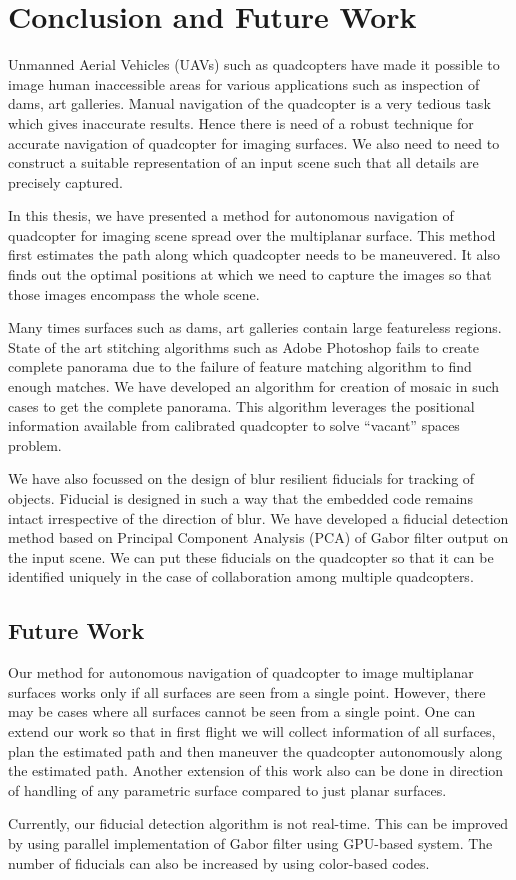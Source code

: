 \chapter{Conclusion and Future Work}
\label{sec:conclusion}
Unmanned Aerial Vehicles (UAVs) such as quadcopters have made it possible to
image human inaccessible areas for various applications such as inspection of
dams, art galleries. Manual navigation of the quadcopter is a very tedious task
which gives inaccurate results. Hence there is need of a robust technique  for
accurate navigation of quadcopter for imaging surfaces. We also need
to need to construct a suitable representation of an input scene such that all
details are precisely captured. 

In this thesis, we have presented a method for autonomous navigation of
quadcopter for imaging scene spread over the multiplanar surface. This method
first estimates the path along which quadcopter needs to be maneuvered. It also
finds out the optimal positions at which we need to capture the images so that
those images encompass the whole scene.

Many times surfaces such as dams, art galleries contain large featureless
regions. State of the art stitching algorithms such as Adobe Photoshop fails to
create complete panorama due to the failure of feature matching algorithm to
find enough matches. We have developed an algorithm for creation of mosaic in such cases to
get the complete panorama. This algorithm leverages the positional information
available from calibrated quadcopter to solve ``vacant'' spaces problem.

We have also focussed on the design of blur resilient fiducials for tracking of
objects. Fiducial is designed in such a way that the embedded code remains
intact irrespective of the direction of blur. We have developed a fiducial
detection method based on Principal Component Analysis (PCA) of Gabor filter
output on the input scene. We can put these fiducials on the quadcopter so that
it can be identified uniquely in the case of collaboration among multiple
quadcopters.

\section{Future Work}
Our method for autonomous navigation of quadcopter to image multiplanar
surfaces works only if all surfaces are seen from a single point. However,
there may be cases where all surfaces cannot be seen from a single point. One
can extend our work so that in first flight we will collect information of all
surfaces, plan the estimated path and then maneuver the quadcopter autonomously
along the estimated path. Another extension of this work also can be done in
direction of handling of any parametric surface compared to just planar
surfaces.

Currently, our fiducial detection algorithm is not real-time. This can be
improved by using parallel implementation of Gabor filter using GPU-based
system. The number of fiducials can also be increased by using color-based
codes.
